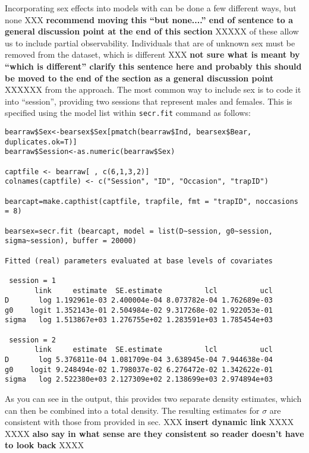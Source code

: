 Incorporating sex effects into models with \secr can be done a few
different ways, but none XXX {\bf recommend moving this ``but none....''
end of sentence to a general discussion point at the end of this
section} XXXXX
of these allow us to include partial observability.   Individuals that
are of unknown sex must be removed from the dataset, which is
different XXX {\bf not sure what is meant by ``which is different'' clarify
this sentence here and probably this should be moved to the end of the
section as a general discussion point} XXXXXX
from the \winbugs approach.  The most common way to include
sex is to code it into ``session'', providing two sessions that
represent males and females.  This is specified using the model list
within \mbox{\tt secr.fit} command as follows:
{\small 
\begin{verbatim}
bearraw$Sex<-bearsex$Sex[pmatch(bearraw$Ind, bearsex$Bear, duplicates.ok=T)]
bearraw$Session<-as.numeric(bearraw$Sex)

captfile <- bearraw[ , c(6,1,3,2)] 
colnames(captfile) <- c("Session", "ID", "Occasion", "trapID")

bearcapt=make.capthist(captfile, trapfile, fmt = "trapID", noccasions = 8)

bearsex=secr.fit (bearcapt, model = list(D~session, g0~session, sigma~session), buffer = 20000)

Fitted (real) parameters evaluated at base levels of covariates 

 session = 1 
       link     estimate  SE.estimate          lcl          ucl
D       log 1.192961e-03 2.400004e-04 8.073782e-04 1.762689e-03
g0    logit 1.352143e-01 2.504984e-02 9.317268e-02 1.922053e-01
sigma   log 1.513867e+03 1.276755e+02 1.283591e+03 1.785454e+03

 session = 2 
       link     estimate  SE.estimate          lcl          ucl
D       log 5.376811e-04 1.081709e-04 3.638945e-04 7.944638e-04
g0    logit 9.248494e-02 1.798037e-02 6.276472e-02 1.342622e-01
sigma   log 2.522380e+03 2.127309e+02 2.138699e+03 2.974894e+03
\end{verbatim}
}
As you can see in the output, this provides two separate density
estimates, which can then be combined into a total density.  The
resulting estimates for $\sigma$ are consistent with those from \winbugs
provided in sec. XXX {\bf insert dynamic link} XXXX XXXX {\bf also say in what
sense are they consistent so reader doesn't have to look back} XXXX

